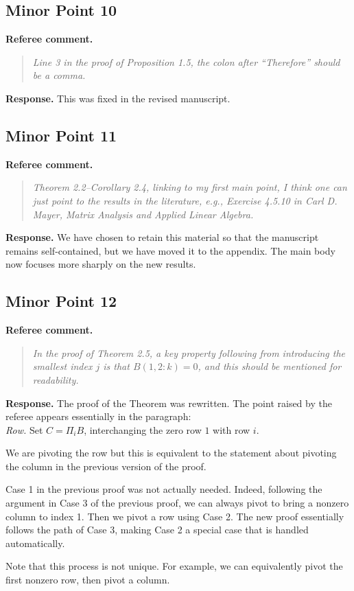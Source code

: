 \documentclass[11pt]{article}
\newenvironment{refereecomment}
{\par\smallskip\noindent\textbf{\color{commentblue}Referee comment.}
\begin{quote}\itshape}
  {
\end{quote}}
\newenvironment{authorresponse}
{\par\smallskip\noindent\textbf{\color{responsegreen}Response.}}
{\par\smallskip}
\begin{document}
\subsection*{Minor Point 10}

\begin{refereecomment}
  Line 3 in the proof of Proposition 1.5, the colon after “Therefore” should be a comma.
\end{refereecomment}

\begin{authorresponse}
  This was fixed in the revised manuscript.
\end{authorresponse}

\subsection*{Minor Point 11}

\begin{refereecomment}
  Theorem 2.2--Corollary 2.4, linking to my first main point, I think one can just point to the results in the literature, e.g., Exercise 4.5.10 in Carl D. Mayer, Matrix Analysis and Applied Linear Algebra.
\end{refereecomment}

\begin{authorresponse}
  We have chosen to retain this material so that the manuscript remains self-contained, but we have moved it to the appendix. The main body now focuses more sharply on the new results.
\end{authorresponse}

\subsection*{Minor Point 12}

\begin{refereecomment}
  In the proof of Theorem 2.5, a key property following from introducing the smallest index $j$ is that $B(1, 2 : k) = 0$, and this should be mentioned for readability.
\end{refereecomment}

\begin{authorresponse}
  The proof of the Theorem was rewritten. The point raised by the referee appears essentially in the paragraph:\\
  \hspace*{2em}\emph{Row.} Set $C = \Pi_i B$, interchanging the zero row $1$ with row $i$.

  We are pivoting the row but this is equivalent to the statement about pivoting the column in the previous version of the proof.

  Case 1 in the previous proof was not actually needed. Indeed, following the argument in Case 3 of the previous proof, we can always pivot to bring a nonzero column to index 1. Then we pivot a row using Case 2. The new proof essentially follows the path of Case 3, making Case 2 a special case that is handled automatically.

  Note that this process is not unique. For example, we can equivalently pivot the first nonzero row, then pivot a column.
\end{authorresponse}
\end{document}
